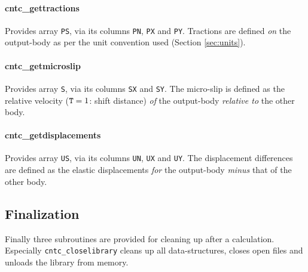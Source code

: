 \documentclass[12pt]{report}
\renewcommand{\magenta}[1]{}
\begin{document}
\paragraph{cntc\_gettractions} Provides array {\tt PS}, via its columns
{\tt PN}, {\tt PX} and {\tt PY}. Tractions are defined {\em on\/} the
output-body as per the unit convention used (Section \ref{sec:units}).  

\paragraph{cntc\_getmicroslip} Provides array {\tt S}, via its columns
{\tt SX} and {\tt SY}. The micro-slip is defined as the relative velocity
(${\tt T}=1$: shift distance) {\em of\/} the output-body {\em relative
to\/} the other body.

\paragraph{cntc\_getdisplacements} Provides array {\tt US}, via its columns
{\tt UN}, {\tt UX} and {\tt UY}. The displacement differences are defined
as the elastic displacements {\em for\/} the output-body {\em minus\/} that
of the other body.

\magenta{
\paragraph{cntc\_getrcfindex} Provides array {\tt RCF}, an elementwise
RCF index. The calculation requires that the shear strength $k$ is provided
along the rail surface, using an extended form of the Miniprof profile
(additional column {\tt 'K'}).  The RCF index is computed as
\begin{eqnarray}
    I\in E &:& rcf_I = -0.5 \nonumber \\
    I\in C &:& rcf_I = \max\left( -0.5, \frac{ \|\vec{p}_{I\tau}\| - k_I }
                              { \max(\epsilon, p_{In}) } \right) .
\end{eqnarray}
The value of $-0.5$ signals that there's no risk of surface-initiated RCF
damage for an element $I$. This is used to ignore elements with small
pressure.
}

\subsection{Finalization}

Finally three subroutines are provided for cleaning up after a calculation.
Especially {\tt cntc\_\-close\-lib\-rary} cleans up all data-structures,
closes open files and unloads the library from memory.
\end{document}
